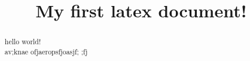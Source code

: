 \title{My first latex document!}

\begin{abstract}
    hello world!\\
    av;knae ofjaeropsfjoasjf; ;fj\\
    [oasdjf fasfwl;ejkfas fiojaf]
\end{abstract}

